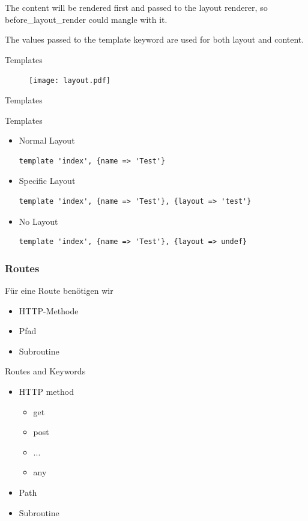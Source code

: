 The content will be rendered first and passed to the
layout renderer, so before\_layout\_render could mangle
with it.

The values passed to the template keyword are used
for both layout and content.

\begin{frame}{Templates}
\begin{figure}
\texttt{[image: layout.pdf]}
\end{figure}
\end{frame}{Templates}

\begin{frame}[fragile]{Templates}
\begin{itemize}
\item Normal Layout
\begin{lstlisting}
template 'index', {name => 'Test'}
\end{lstlisting}
\item Specific Layout
\begin{lstlisting}
template 'index', {name => 'Test'}, {layout => 'test'}
\end{lstlisting}
\item No Layout
\begin{lstlisting}
template 'index', {name => 'Test'}, {layout => undef}
\end{lstlisting}
\end{itemize}
\end{frame}

\subsubsection{Routes}

Für eine Route benötigen wir

\begin{itemize}
\item HTTP-Methode
\item Pfad
\item Subroutine
\end{itemize}

\begin{frame}{Routes and Keywords}
\begin{itemize}
\item HTTP method
\begin{itemize}
\item get
\item post
\item ...
\item any
\end{itemize}
\item Path
\item Subroutine
\end{itemize}
\end{frame}

